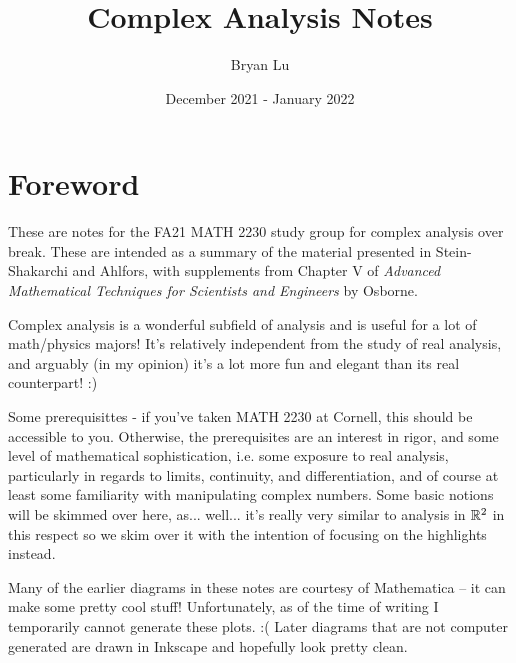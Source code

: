 \documentclass[12pt]{scrartcl}
\title{Complex Analysis Notes}
\author{Bryan Lu}
\date{December 2021 - January 2022} %
\begin{document}
\maketitle

\setcounter{section}{-1}
\section{Foreword}
These are notes for the FA21 MATH 2230 study group for complex analysis over break. These are intended as a summary of the material presented in Stein-Shakarchi and Ahlfors, with supplements from Chapter V of \textit{Advanced Mathematical Techniques for Scientists and Engineers} by Osborne.

Complex analysis is a wonderful subfield of analysis and is useful for a lot of math/physics majors! It's relatively independent from the study of real analysis, and arguably (in my opinion) it's a lot more fun and elegant than its real counterpart! :)

Some prerequisittes - if you've taken MATH 2230 at Cornell, this should be accessible to you. Otherwise, the prerequisites are an interest in rigor, and some level of mathematical sophistication, i.e. some exposure to real analysis, particularly in regards to limits, continuity, and differentiation, and of course at least some familiarity with manipulating complex numbers. Some basic notions will be skimmed over here, as... well... it's really very similar to analysis in $\mathbb R^2$ in this respect so we skim over it with the intention of  focusing on the highlights instead.

Many of the earlier diagrams in these notes are courtesy of Mathematica -- it can make some pretty cool stuff! Unfortunately, as of the time of writing I temporarily cannot generate these plots. :( Later diagrams that are not computer generated are drawn in Inkscape and hopefully look pretty clean.

\pagebreak



\end{document}

